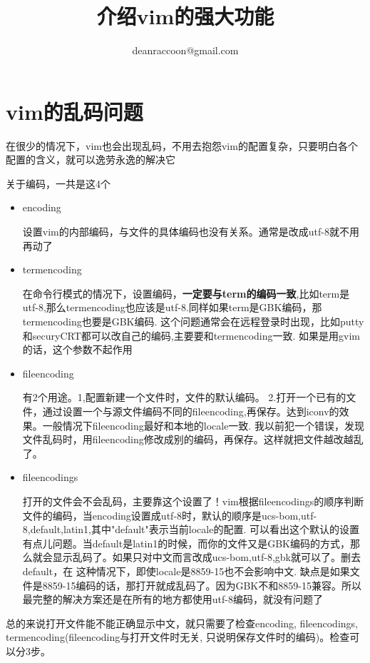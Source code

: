 \documentclass[adobefonts]{ctexart}
\title{\textbf{介绍vim的强大功能}}
\author{deanraccoon@gmail.com}
\begin{document}
\maketitle
\tableofcontents
\newpage

\section{vim的乱码问题}
在很少的情况下，vim也会出现乱码，不用去抱怨vim的配置复杂，只要明白各个配置的含义，就可以逸劳永逸的解决它

关于编码，一共是这4个
\begin{itemize}
\item encoding 

设置vim的内部编码，与文件的具体编码也没有关系。通常是改成utf-8就不用再动了

\item termencoding 

在命令行模式的情况下，设置编码，\textbf{一定要与term的编码一致},比如term是utf-8,那么termencoding也应该是utf-8.同样如果term是GBK编码，那termencoding也要是GBK编码. 这个问题通常会在远程登录时出现，比如putty和securyCRT都可以改自己的编码,主要要和termencoding一致. 如果是用gvim的话，这个参数不起作用

\item fileencoding  

有2个用途。1,配置新建一个文件时，文件的默认编码。 2.打开一个已有的文件，通过设置一个与源文件编码不同的fileencoding,再保存。达到iconv的效果。一般情况下fileencoding最好和本地的locale一致. 我以前犯一个错误，发现文件乱码时，用fileencoding修改成别的编码，再保存。这样就把文件越改越乱了。

\item fileencodings

打开的文件会不会乱码，主要靠这个设置了！vim根据fileencodings的顺序判断文件的编码，当encoding设置成utf-8时，默认的顺序是ucs-bom,utf-8,default,latin1,其中"default"表示当前locale的配置. 可以看出这个默认的设置有点儿问题。当default是latin1的时候，而你的文件又是GBK编码的方式，那么就会显示乱码了。如果只对中文而言改成ucs-bom,utf-8,gbk就可以了。删去default，在
这种情况下，即使locale是8859-15也不会影响中文. 缺点是如果文件是8859-15编码的话，那打开就成乱码了。因为GBK不和8859-15兼容。所以最完整的解决方案还是在所有的地方都使用utf-8编码，就没有问题了
\end{itemize}
总的来说打开文件能不能正确显示中文，就只需要了检查encoding, fileencodings, termencoding(fileencoding与打开文件时无关, 只说明保存文件时的编码)。检查可以分3步。
\end{document}
